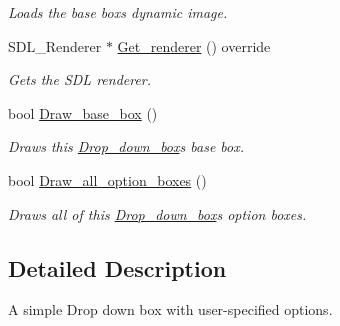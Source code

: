\begin{DoxyCompactItemize}
\begin{DoxyCompactList}\small\item\em Loads the base box\textquotesingle{}s dynamic image. \end{DoxyCompactList}\item 
S\+D\+L\+\_\+\+Renderer $\ast$ \hyperlink{classjetfuel_1_1gui_1_1Drop__down__box_ab8beac8ed8b442d96723f72a2fe9edb6}{Get\+\_\+renderer} () override
\begin{DoxyCompactList}\small\item\em Gets the S\+DL renderer. \end{DoxyCompactList}\item 
bool \hyperlink{classjetfuel_1_1gui_1_1Drop__down__box_a7bc0f38e40897db13797e4937a50c334}{Draw\+\_\+base\+\_\+box} ()
\begin{DoxyCompactList}\small\item\em Draws this \hyperlink{classjetfuel_1_1gui_1_1Drop__down__box}{Drop\+\_\+down\+\_\+box}\textquotesingle{}s base box. \end{DoxyCompactList}\item 
bool \hyperlink{classjetfuel_1_1gui_1_1Drop__down__box_ae29b89b98fa3211ead2fffc712ce264f}{Draw\+\_\+all\+\_\+option\+\_\+boxes} ()
\begin{DoxyCompactList}\small\item\em Draws all of this \hyperlink{classjetfuel_1_1gui_1_1Drop__down__box}{Drop\+\_\+down\+\_\+box}\textquotesingle{}s option boxes. \end{DoxyCompactList}\end{DoxyCompactItemize}


\subsection{Detailed Description}
A simple Drop down box with user-\/specified options.

